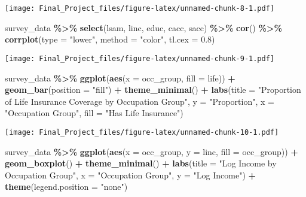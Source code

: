 \documentclass[
]{article}
\newenvironment{Shaded}{\begin{snugshade}}{\end{snugshade}}
\newcommand{\AttributeTok}[1]{\textcolor[rgb]{0.13,0.29,0.53}{#1}}
\newcommand{\FloatTok}[1]{\textcolor[rgb]{0.00,0.00,0.81}{#1}}
\newcommand{\FunctionTok}[1]{\textcolor[rgb]{0.13,0.29,0.53}{\textbf{#1}}}
\newcommand{\NormalTok}[1]{#1}
\newcommand{\SpecialCharTok}[1]{\textcolor[rgb]{0.81,0.36,0.00}{\textbf{#1}}}
\newcommand{\StringTok}[1]{\textcolor[rgb]{0.31,0.60,0.02}{#1}}
\begin{document}
\texttt{[image: Final\_Project\_files/figure-latex/unnamed-chunk-8-1.pdf]}

\begin{Shaded}
\begin{Highlighting}[]
\NormalTok{survey\_data }\SpecialCharTok{\%\textgreater{}\%}
  \FunctionTok{select}\NormalTok{(lsam, linc, educ, cacc, sacc) }\SpecialCharTok{\%\textgreater{}\%}
  \FunctionTok{cor}\NormalTok{() }\SpecialCharTok{\%\textgreater{}\%}
  \FunctionTok{corrplot}\NormalTok{(}\AttributeTok{type =} \StringTok{"lower"}\NormalTok{, }\AttributeTok{method =} \StringTok{"color"}\NormalTok{, }\AttributeTok{tl.cex =} \FloatTok{0.8}\NormalTok{)}
\end{Highlighting}
\end{Shaded}

\texttt{[image: Final\_Project\_files/figure-latex/unnamed-chunk-9-1.pdf]}

\begin{Shaded}
\begin{Highlighting}[]
\NormalTok{survey\_data }\SpecialCharTok{\%\textgreater{}\%}
  \FunctionTok{ggplot}\NormalTok{(}\FunctionTok{aes}\NormalTok{(}\AttributeTok{x =}\NormalTok{ occ\_group, }\AttributeTok{fill =}\NormalTok{ life)) }\SpecialCharTok{+}
  \FunctionTok{geom\_bar}\NormalTok{(}\AttributeTok{position =} \StringTok{"fill"}\NormalTok{) }\SpecialCharTok{+}
  \FunctionTok{theme\_minimal}\NormalTok{() }\SpecialCharTok{+}
  \FunctionTok{labs}\NormalTok{(}\AttributeTok{title =} \StringTok{"Proportion of Life Insurance Coverage by Occupation Group"}\NormalTok{,}
       \AttributeTok{y =} \StringTok{"Proportion"}\NormalTok{, }\AttributeTok{x =} \StringTok{"Occupation Group"}\NormalTok{, }\AttributeTok{fill =} \StringTok{"Has Life Insurance"}\NormalTok{)}
\end{Highlighting}
\end{Shaded}

\texttt{[image: Final\_Project\_files/figure-latex/unnamed-chunk-10-1.pdf]}

\begin{Shaded}
\begin{Highlighting}[]
\NormalTok{survey\_data }\SpecialCharTok{\%\textgreater{}\%}
  \FunctionTok{ggplot}\NormalTok{(}\FunctionTok{aes}\NormalTok{(}\AttributeTok{x =}\NormalTok{ occ\_group, }\AttributeTok{y =}\NormalTok{ linc, }\AttributeTok{fill =}\NormalTok{ occ\_group)) }\SpecialCharTok{+}
  \FunctionTok{geom\_boxplot}\NormalTok{() }\SpecialCharTok{+}
  \FunctionTok{theme\_minimal}\NormalTok{() }\SpecialCharTok{+}
  \FunctionTok{labs}\NormalTok{(}\AttributeTok{title =} \StringTok{"Log Income by Occupation Group"}\NormalTok{,}
       \AttributeTok{x =} \StringTok{"Occupation Group"}\NormalTok{, }\AttributeTok{y =} \StringTok{"Log Income"}\NormalTok{) }\SpecialCharTok{+}
  \FunctionTok{theme}\NormalTok{(}\AttributeTok{legend.position =} \StringTok{"none"}\NormalTok{)}
\end{Highlighting}
\end{Shaded}
\end{document}
